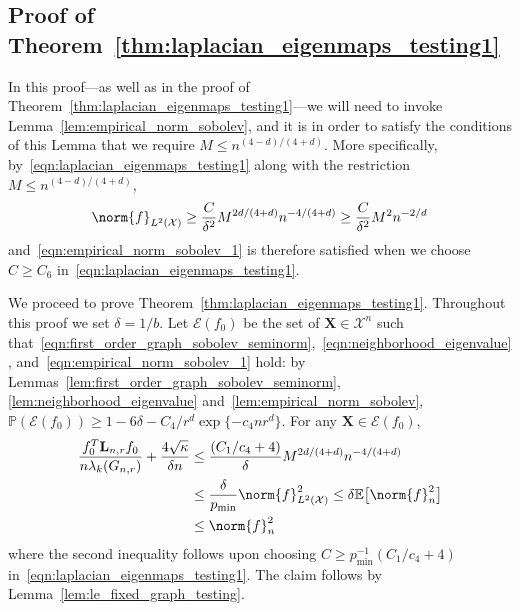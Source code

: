 \documentclass{article}
\newcommand{\1}{\mathbf{1}}
\newcommand{\Lap}{{\bf L}}
\newcommand{\Xset}{\mathcal{X}}
\newcommand{\Leb}{L}
\newcommand{\mc}[1]{\mathcal{#1}}
\newcommand{\Pbb}{\mathbb{P}}
\newcommand{\Ebb}{\mathbb{E}}
\theoremstyle{alden}
\theoremstyle{aldenthm}
\theoremstyle{definition}
\theoremstyle{remark}
\begin{document}
\subsection{Proof of Theorem~\ref{thm:laplacian_eigenmaps_testing1}}
In this proof---as well as in the proof of Theorem~\ref{thm:laplacian_eigenmaps_testing1}---we will need to invoke Lemma~\ref{lem:empirical_norm_sobolev}, and it is in order to satisfy the conditions of this Lemma that we require $M \leq n^{(4 - d)/(4 + d)}$. More specifically, by~\eqref{eqn:laplacian_eigenmaps_testing1} along with the restriction $M \leq n^{(4 - d)/(4 + d)}$,
\begin{equation*}
\norm{f}_{\Leb^2(\Xset)} \geq \frac{C}{\delta^2} M^{2d/(4 + d)} n^{-4/(4 + d)} \geq \frac{C}{\delta^2} M^2 n^{-2/d}
\end{equation*}
and~\eqref{eqn:empirical_norm_sobolev_1} is therefore satisfied when we choose $C \geq C_6$ in~\eqref{eqn:laplacian_eigenmaps_testing1}.

We proceed to prove Theorem~\ref{thm:laplacian_eigenmaps_testing1}. Throughout this proof we set $\delta = 1/b$. Let $\mc{E}(f_0)$ be the set of $\mathbf{X} \in \Xset^n$ such that~\eqref{eqn:first_order_graph_sobolev_seminorm},~\eqref{eqn:neighborhood_eigenvalue}, and~\eqref{eqn:empirical_norm_sobolev_1} hold: by Lemmas~\ref{lem:first_order_graph_sobolev_seminorm},\ref{lem:neighborhood_eigenvalue} and~\ref{lem:empirical_norm_sobolev}, $\Pbb(\mc{E}(f_0)) \geq 1 - 6\delta - C_4/r^d\exp\{-c_4nr^d\}$. For any $\mathbf{X} \in \mc{E}(f_0)$,
\begin{align*}
\frac{f_0^T \Lap_{{n,r}} f_0}{n \lambda_k(G_{n,r})} + \frac{4\sqrt{\kappa}}{\delta n} & \leq \frac{(C_1/c_4 + 4)}{\delta}M^{2d/(4 + d)}n^{-4/(4 + d)} \\
& \leq \frac{\delta}{p_{\min}} \norm{f}_{\Leb^2(\Xset)}^2 \leq \delta \Ebb\bigl[\norm{f}_n^2\bigr] \\
& \leq \norm{f}_n^2
\end{align*}
where the second inequality follows upon choosing $C \geq p_{\min}^{-1}(C_1/c_4 + 4)$ in~\eqref{eqn:laplacian_eigenmaps_testing1}. The claim follows by Lemma~\ref{lem:le_fixed_graph_testing}.
\end{document}

